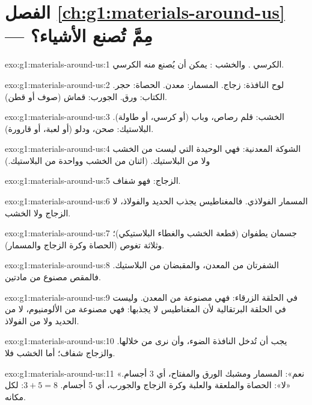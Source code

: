 \section*{الفصل \ref{ch:g1:materials-around-us} --- مِمَّ تُصنع الأشياء؟}

\begin{solution}{exo:g1:materials-around-us:1}
الكرسي . والخشب : يمكن أن يُصنع منه الكرسي.
\end{solution}

\begin{solution}{exo:g1:materials-around-us:2}
لوح النافذة: زجاج. المسمار: معدن. الحصاة: حجر. الكتاب: ورق. الجورب:
قماش (صوف أو قطن).
\end{solution}

\begin{solution}{exo:g1:materials-around-us:3}
الخشب: قلم رصاص، وباب (أو كرسي، أو طاولة). البلاستيك: صحن، ودلو
(أو لعبة، أو قارورة).
\end{solution}

\begin{solution}{exo:g1:materials-around-us:4}
الشوكة المعدنية: فهي الوحيدة التي ليست من الخشب ولا من البلاستيك.
(اثنان من الخشب وواحدة من البلاستيك.)
\end{solution}

\begin{solution}{exo:g1:materials-around-us:5}
الزجاج: فهو شفاف.
\end{solution}

\begin{solution}{exo:g1:materials-around-us:6}
المسمار الفولاذي. فالمغناطيس يجذب الحديد والفولاذ، لا الزجاج ولا الخشب.
\end{solution}

\begin{solution}{exo:g1:materials-around-us:7}
جسمان يطفوان (قطعة الخشب والغطاء البلاستيكي)؛ وثلاثة تغوص
(الحصاة وكرة الزجاج والمسمار).
\end{solution}

\begin{solution}{exo:g1:materials-around-us:8}
الشفرتان من المعدن، والمقبضان من البلاستيك. فالمقص مصنوع من
مادتين.
\end{solution}

\begin{solution}{exo:g1:materials-around-us:9}
في الحلقة الزرقاء: فهي مصنوعة من المعدن. وليست في الحلقة البرتقالية
لأن المغناطيس لا يجذبها: فهي مصنوعة من الألومنيوم، لا من الحديد ولا
من الفولاذ.
\end{solution}

\begin{solution}{exo:g1:materials-around-us:10}
يجب أن تُدخل النافذة الضوء، وأن نرى من خلالها. والزجاج شفاف؛ أما
الخشب فلا.
\end{solution}

\begin{solution}{exo:g1:materials-around-us:11}
«نعم»: المسمار ومشبك الورق والمفتاح، أي 3 أجسام. «لا»:
الحصاة والملعقة والعلبة وكرة الزجاج والجورب، أي 5 أجسام.
$3 + 5 = 8$: لكل  مكانه.
\end{solution}
